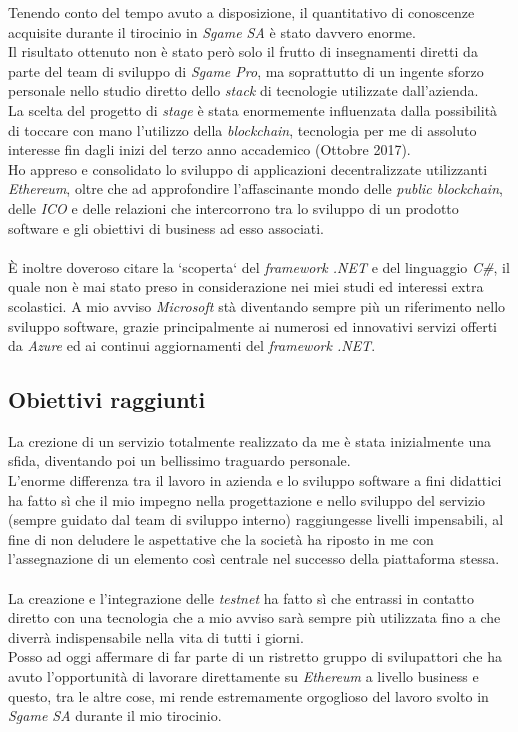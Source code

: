 \documentclass[11pt]{thesistemp}
\begin{document}
Tenendo conto del tempo avuto a disposizione, il quantitativo di conoscenze acquisite durante il tirocinio in \textit{Sgame SA} è stato davvero enorme.\\
Il risultato ottenuto non è stato però solo il frutto di insegnamenti diretti da parte del team di sviluppo di \textit{Sgame Pro}, ma soprattutto di un ingente sforzo personale nello studio diretto dello \textit{stack} di tecnologie utilizzate dall'azienda.\\
La scelta del progetto di \textit{stage} è stata enormemente influenzata dalla possibilità di toccare con mano l'utilizzo della \textit{blockchain}, tecnologia per me di assoluto interesse fin dagli inizi del terzo anno accademico (Ottobre 2017).\\
Ho appreso e consolidato lo sviluppo di applicazioni decentralizzate utilizzanti \textit{Ethereum}, oltre che ad approfondire l'affascinante mondo delle \textit{public blockchain}, delle \textit{ICO} e delle relazioni che intercorrono tra lo sviluppo di un prodotto software e gli obiettivi di business ad esso associati.\\\\
\`E inoltre doveroso citare la `scoperta` del \textit{framework .NET} e del linguaggio \textit{C\#}, il quale non è mai stato preso in considerazione nei miei studi ed interessi extra scolastici.
A mio avviso \textit{Microsoft} stà diventando sempre più un riferimento nello sviluppo software, grazie principalmente ai numerosi ed innovativi servizi offerti da \textit{Azure} ed ai continui aggiornamenti del \textit{framework .NET}.

\subsection{Obiettivi raggiunti}

La crezione di un servizio totalmente realizzato da me è stata inizialmente una sfida, diventando poi un bellissimo traguardo personale.\\
L'enorme differenza tra il lavoro in azienda e lo sviluppo software a fini didattici ha fatto sì che il mio impegno nella progettazione e nello sviluppo del servizio (sempre guidato dal team di sviluppo interno) raggiungesse livelli impensabili, al fine di non deludere le aspettative che la società ha riposto in me con l'assegnazione di un elemento così centrale nel successo della piattaforma stessa.\\\\
La creazione e l'integrazione delle \textit{testnet} ha fatto sì che entrassi in contatto diretto con una tecnologia che a mio avviso sarà sempre più utilizzata fino a che diverrà indispensabile nella vita di tutti i giorni.\\
Posso ad oggi affermare di far parte di un ristretto gruppo di svilupattori che ha avuto l'opportunità di lavorare direttamente su \textit{Ethereum} a livello business e questo, tra le altre cose, mi rende estremamente orgoglioso del lavoro svolto in \textit{Sgame SA} durante il mio tirocinio. 
\end{document}
